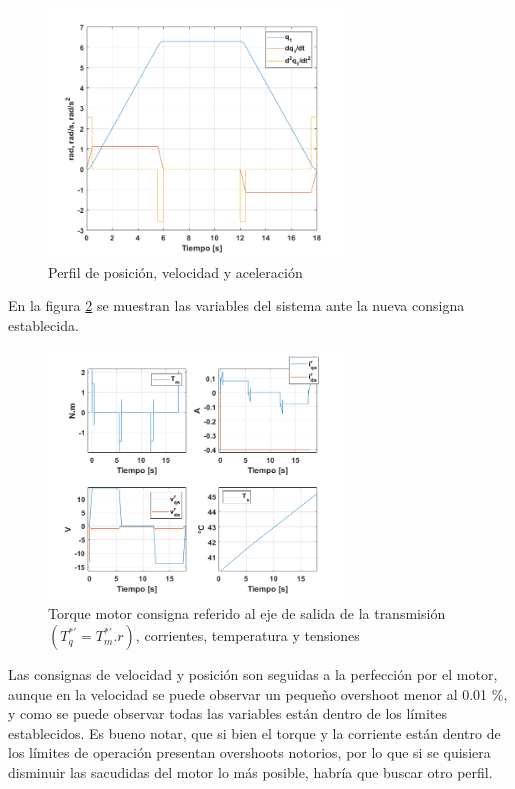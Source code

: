 \documentclass[10pt]{article}
\begin{document}
\begin{itemize}
 \begin{figure}[h!]
	\centering
	\includegraphics[width=0.7\textwidth]{consignasnuevas.png}
	\caption{\label{fig:consignasnuevas}Perfil de posición, velocidad y aceleración}
	\end{figure}

	En la figura \ref{fig:consignanuevapara} se muestran las variables del sistema ante la nueva consigna establecida.

	\begin{figure}[h!]
		\centering
		\includegraphics[width=0.7\textwidth]{consignanuevapara.png}
		\caption{\label{fig:consignanuevapara}Torque motor consigna referido al eje de salida de la transmisión $(T^{*'}_{q}=T^{*'}_{m}.r)$, corrientes, temperatura y tensiones}
		\end{figure}

	Las consignas de velocidad y posición son seguidas a la perfección por el motor, aunque en la velocidad se puede observar un pequeño overshoot menor al 0.01 \%, y como se puede observar todas las variables están dentro de los límites establecidos.
	Es bueno notar, que si bien el torque y la corriente están dentro de los límites de operación presentan overshoots notorios, por lo que si se quisiera disminuir las sacudidas del motor lo más posible, habría que buscar otro perfil.
	 

\end{itemize}
\end{document}
